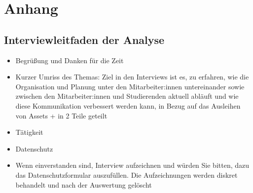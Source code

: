 \renewcommand{\thesection}{\Alph{section}}
\chapter{Anhang}

\section{Interviewleitfaden der Analyse}
\label{appendix:interview}

\begin{itemize}
    \item Begrüßung und Danken für die Zeit
    \item Kurzer Umriss des Themas: Ziel in den Interviews ist es, zu erfahren, wie die Organisation
          und Planung unter den Mitarbeiter:innen untereinander sowie zwischen den Mitarbeiter:innen und
          Studierenden aktuell abläuft und wie diese Kommunikation verbessert werden kann, in Bezug auf
          das Ausleihen von Assets + in 2 Teile geteilt
    \item Tätigkeit
    \item Datenschutz
    \item Wenn einverstanden sind, Interview aufzeichnen und würden Sie bitten, dazu das
          Datenschutzformular auszufüllen. Die Aufzeichnungen werden diskret behandelt und nach der
          Auswertung gelöscht
\end{itemize}

